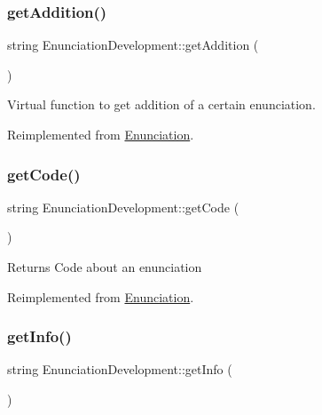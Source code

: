 \subsubsection{\texorpdfstring{get\+Addition()}{getAddition()}}
{\footnotesize\ttfamily string Enunciation\+Development\+::get\+Addition (\begin{DoxyParamCaption}{ }\end{DoxyParamCaption})\hspace{0.3cm}{\ttfamily [virtual]}}



Virtual function to get addition of a certain enunciation. 



Reimplemented from \hyperlink{class_enunciation_ad0bf6d8d34f6246cd5bc674b15b5958b}{Enunciation}.

\mbox{\label{class_enunciation_development_aa0e2d2c396cc3ec68df31334ae475850}} 
\subsubsection{\texorpdfstring{get\+Code()}{getCode()}}
{\footnotesize\ttfamily string Enunciation\+Development\+::get\+Code (\begin{DoxyParamCaption}{ }\end{DoxyParamCaption})\hspace{0.3cm}{\ttfamily [virtual]}}

\begin{DoxyReturn}{Returns}
Code about an enunciation 
\end{DoxyReturn}


Reimplemented from \hyperlink{class_enunciation_a2c27d4c83302dd7d21e1064c9e4ec97d}{Enunciation}.

\mbox{\label{class_enunciation_development_a06289f811338e030977e59f083c618b6}} 
\subsubsection{\texorpdfstring{get\+Info()}{getInfo()}}
{\footnotesize\ttfamily string Enunciation\+Development\+::get\+Info (\begin{DoxyParamCaption}{ }\end{DoxyParamCaption})\hspace{0.3cm}{\ttfamily [virtual]}}

